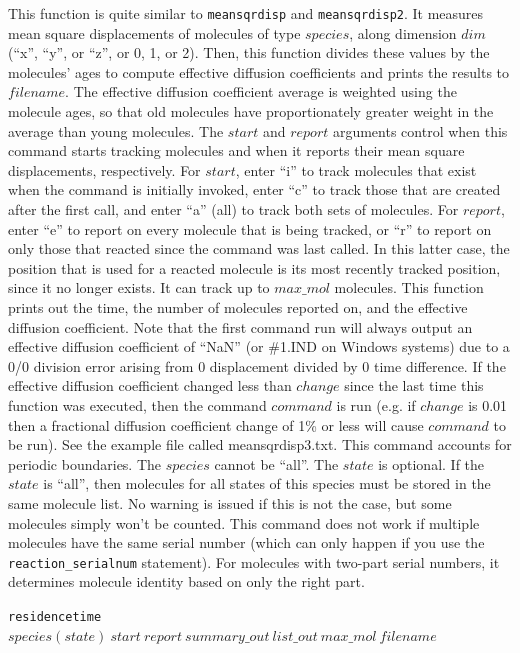 \documentclass {scrbook}
\newcommand {\ttt} {\texttt}
\begin{document}
\begin{description}
This function is quite similar to \ttt{meansqrdisp} and \ttt{meansqrdisp2}. It measures mean square displacements of molecules of type $species$, along dimension $dim$ (``x'', ``y'', or ``z'', or 0, 1, or 2). Then, this function divides these values by the molecules' ages to compute effective diffusion coefficients and prints the results to $filename$. The effective diffusion coefficient average is weighted using the molecule ages, so that old molecules have proportionately greater weight in the average than young molecules. The $start$ and $report$ arguments control when this command starts tracking molecules and when it reports their mean square displacements, respectively. For $start$, enter ``i'' to track molecules that exist when the command is initially invoked, enter ``c'' to track those that are created after the first call, and enter ``a'' (all) to track both sets of molecules. For $report$, enter ``e'' to report on every molecule that is being tracked, or ``r'' to report on only those that reacted since the command was last called. In this latter case, the position that is used for a reacted molecule is its most recently tracked position, since it no longer exists. It can track up to $max\_mol$ molecules. This function prints out the time, the number of molecules reported on, and the effective diffusion coefficient. Note that the first command run will always output an effective diffusion coefficient of ``NaN'' (or \#1.IND on Windows systems) due to a 0/0 division error arising from 0 displacement divided by 0 time difference. If the effective diffusion coefficient changed less than $change$ since the last time this function was executed, then the command $command$ is run (e.g. if $change$ is 0.01 then a fractional diffusion coefficient change of 1\% or less will cause $command$ to be run). See the example file called meansqrdisp3.txt. This command accounts for periodic boundaries. The $species$ cannot be ``all''. The $state$ is optional. If the $state$ is ``all'', then molecules for all states of this species must be stored in the same molecule list. No warning is issued if this is not the case, but some molecules simply won't be counted. This command does not work if multiple molecules have the same serial number (which can only happen if you use the \ttt{reaction\_serialnum} statement). For molecules with two-part serial numbers, it determines molecule identity based on only the right part.

\item{\ttt{residencetime} $species(state)\ start\ report\ summary\_out\ list\_out\ max\_mol\ filename$}


\end{description}
\end{document}
